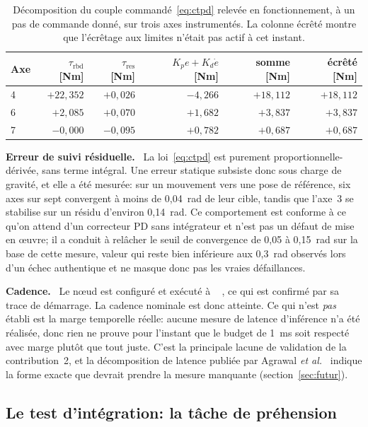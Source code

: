 \documentclass[a4paper, oneside]{article}
\newcommand{\parag}[1]{%
    \par\medskip\noindent\textbf{#1}\ \ignorespaces%
}
\newcommand{\code}[1]{%
    \mbox{\ttfamily\small%
        \detokenize{#1}%
    }%
}
\newcommand{\taurbd}{\ensuremath{\tau_{\mathrm{rbd}}}}
\newcommand{\taures}{\ensuremath{\tau_{\mathrm{res}}}}
\begin{document}
\begin{table}[htbp]
\centering
\caption{Décomposition du couple commandé~\eqref{eq:ctpd} relevée en
fonctionnement, à un pas de commande donné, sur trois axes instrumentés. La
colonne \og écrêté \fg{} montre que l'écrêtage aux limites n'était pas actif à
cet instant.}
\label{tab:tau}
\small
\begin{tabular}{@{}lrrrrr@{}}
\toprule
Axe & $\taurbd$ [Nm] & $\taures$ [Nm] & $K_p e + K_d\dot{e}$ [Nm]
& somme [Nm] & écrêté [Nm] \\
\midrule
4 & $+22{,}352$ & $+0{,}026$ & $-4{,}266$ & $+18{,}112$ & $+18{,}112$ \\
6 & $+2{,}085$  & $+0{,}070$ & $+1{,}682$ & $+3{,}837$  & $+3{,}837$ \\
7 & $-0{,}000$  & $-0{,}095$ & $+0{,}782$ & $+0{,}687$  & $+0{,}687$ \\
\bottomrule
\end{tabular}
\end{table}

\parag{Erreur de suivi résiduelle.} La loi~\eqref{eq:ctpd} est purement
proportionnelle-dérivée, sans terme intégral. Une erreur statique subsiste donc
sous charge de gravité, et elle a été mesurée: sur un mouvement vers une pose
de référence, six axes sur sept convergent à moins de 0{,}04~rad de leur cible,
tandis que l'axe~3 se stabilise sur un résidu d'environ 0{,}14~rad. Ce
comportement est conforme à ce qu'on attend d'un correcteur PD sans intégrateur
et n'est pas un défaut de mise en \oe uvre; il a conduit à relâcher le seuil de
convergence de 0{,}05 à 0{,}15~rad sur la base de cette mesure, valeur qui reste
bien inférieure aux 0{,}3~rad observés lors d'un échec authentique et ne masque
donc pas les vraies défaillances.

\parag{Cadence.} Le n\oe ud est configuré et exécuté à
\code{control_rate_hz = 1000}, ce qui est confirmé par sa trace de démarrage. La
cadence nominale est donc atteinte. Ce qui n'est \emph{pas} établi est la marge
temporelle réelle: aucune mesure de latence d'inférence n'a été réalisée, donc
rien ne prouve pour l'instant que le budget de 1~ms soit respecté avec marge
plutôt que tout juste. C'est la principale lacune de validation de la
contribution~2, et la décomposition de latence publiée par
Agrawal \emph{et al.}~\cite{agrawal2026} indique la forme exacte que devrait
prendre la mesure manquante (section~\ref{sec:futur}).

\subsection{Le test d'intégration: la tâche de préhension}
\label{sec:res-task}
\end{document}
